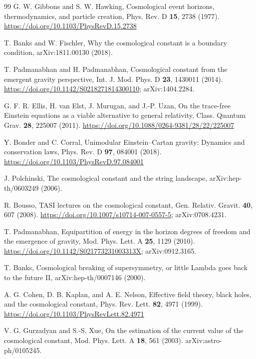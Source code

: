 \documentclass[aps,prd,twocolumn,superscriptaddress,nofootinbib,showkeys]{revtex4-2}
\begin{document}
\begin{thebibliography}{99}
 G. W. Gibbons and S. W. Hawking, Cosmological event horizons, thermodynamics, and particle creation, Phys. Rev. D \textbf{15}, 2738 (1977). \url{https://doi.org/10.1103/PhysRevD.15.2738}

 T. Banks and W. Fischler, Why the cosmological constant is a boundary condition, arXiv:1811.00130 (2018).

 T. Padmanabhan and H. Padmanabhan, Cosmological constant from the emergent gravity perspective, Int. J. Mod. Phys. D \textbf{23}, 1430011 (2014). \url{https://doi.org/10.1142/S0218271814300110}; arXiv:1404.2284.

 G. F. R. Ellis, H. van Elst, J. Murugan, and J.-P. Uzan, On the trace-free Einstein equations as a viable alternative to general relativity, Class. Quantum Grav. \textbf{28}, 225007 (2011). \url{https://doi.org/10.1088/0264-9381/28/22/225007}

 Y. Bonder and C. Corral, Unimodular Einstein--Cartan gravity: Dynamics and conservation laws, Phys. Rev. D \textbf{97}, 084001 (2018). \url{https://doi.org/10.1103/PhysRevD.97.084001}

 J. Polchinski, The cosmological constant and the string landscape, arXiv:hep-th/0603249 (2006).

 R. Bousso, TASI lectures on the cosmological constant, Gen. Relativ. Gravit. \textbf{40}, 607 (2008). \url{https://doi.org/10.1007/s10714-007-0557-5}; arXiv:0708.4231.

 T. Padmanabhan, Equipartition of energy in the horizon degrees of freedom and the emergence of gravity, Mod. Phys. Lett. A \textbf{25}, 1129 (2010). \url{https://doi.org/10.1142/S021773231003313X}; arXiv:0912.3165.

 T. Banks, Cosmological breaking of supersymmetry, or little Lambda goes back to the future II, arXiv:hep-th/0007146 (2000).

 A. G. Cohen, D. B. Kaplan, and A. E. Nelson, Effective field theory, black holes, and the cosmological constant, Phys. Rev. Lett. \textbf{82}, 4971 (1999). \url{https://doi.org/10.1103/PhysRevLett.82.4971}

 V. G. Gurzadyan and S.-S. Xue, On the estimation of the current value of the cosmological constant, Mod. Phys. Lett. A \textbf{18}, 561 (2003). arXiv:astro-ph/0105245.


\end{thebibliography}
\end{document}
